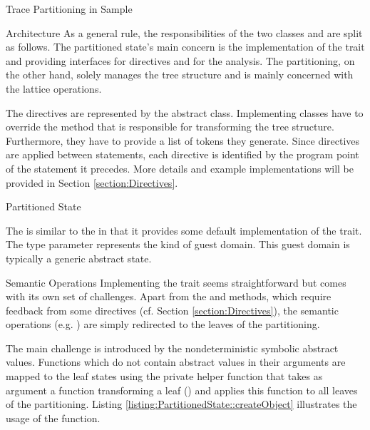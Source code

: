 \begin{chapter}{Trace Partitioning in Sample}
\begin{section}{Architecture}
		As a general rule, the responsibilities of the two classes  and  are split as follows. The partitioned state's main concern is the implementation of the  trait and providing interfaces for directives and for the analysis. The partitioning, on the other hand, solely manages the tree structure and is mainly concerned with the lattice operations.

		The directives are represented by the abstract  class. Implementing classes have to override the  method that is responsible for transforming the tree structure. Furthermore, they have to provide a list of tokens they generate. Since directives are applied between statements, each directive is identified by the program point of the statement it precedes. More details and example implementations will be provided in Section \ref{section:Directives}. 


		\begin{subsection}{Partitioned State}
			\label{subsection:PartitionedState}

			The  is similar to the  in that it provides some default implementation of the  trait. The type parameter  represents the kind of guest domain. This guest domain is typically a generic abstract state.


			\begin{subsubsection}{Semantic Operations}
				Implementing the  trait seems straightforward but comes with its own set of challenges. Apart from the  and  methods, which require feedback from some directives (cf. Section \ref{section:Directives}), the semantic operations (e.g. ) are simply redirected to the leaves of the partitioning.

				The main challenge is introduced by the nondeterministic symbolic abstract values. Functions which do not contain abstract values in their arguments are mapped to the leaf states using the private helper function  that takes as argument a function transforming a leaf () and applies this function to all leaves of the partitioning. Listing \ref{listing:PartitionedState::createObject} illustrates the usage of the  function.

				


\end{subsubsection}
\end{subsection}
\end{section}
\end{chapter}
